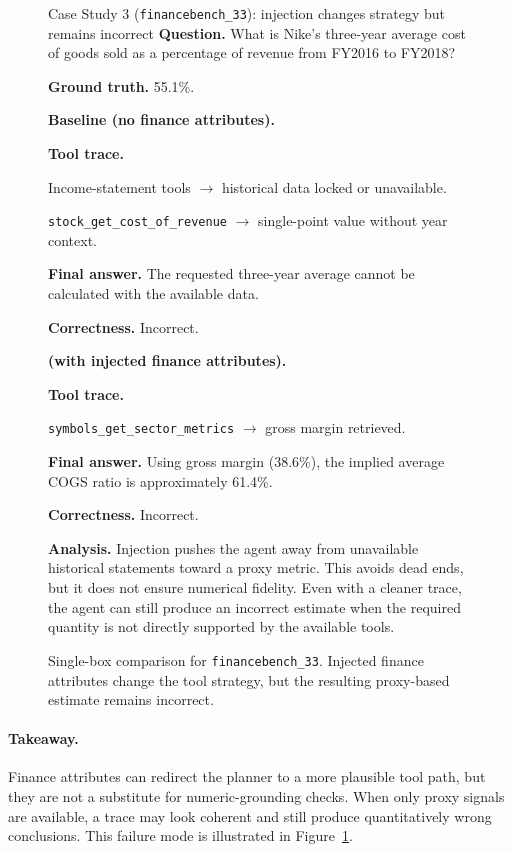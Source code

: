 \begin{figure}[!t]
\begin{casecard}{Case Study 3 (\texttt{financebench\_33}): injection changes strategy but remains incorrect}
\textbf{Question.} What is Nike's three-year average cost of goods sold as a percentage of revenue from FY2016 to FY2018?\par
\smallskip
\textbf{Ground truth.} 55.1\%.\par
\medskip
\begin{minipage}[t]{0.49\textwidth}
  
\textbf{Baseline (no finance attributes).}\par
\textbf{Tool trace.}\par
Income-statement tools $\rightarrow$ historical data locked or unavailable.\par
\texttt{stock\_get\_cost\_of\_revenue} $\rightarrow$ single-point value without year context.\par
\textbf{Final answer.} The requested three-year average cannot be calculated with the available data.\par
\textbf{Correctness.} Incorrect.\par
\end{minipage}\hfill
\begin{minipage}[t]{0.49\textwidth}
\textbf{\methodname{} (with injected finance attributes).}\par
\textbf{Tool trace.}\par
\texttt{symbols\_get\_sector\_metrics} $\rightarrow$ gross margin retrieved.\par
\textbf{Final answer.} Using gross margin (38.6\%), the implied average COGS ratio is approximately 61.4\%.\par
\textbf{Correctness.} Incorrect.\par
\end{minipage}
\medskip

\textbf{Analysis.} Injection pushes the agent away from unavailable historical statements toward a proxy metric. This avoids dead ends, but it does not ensure numerical fidelity. Even with a cleaner trace, the agent can still produce an incorrect estimate when the required quantity is not directly supported by the available tools.\par
\end{casecard}
\caption{Single-box comparison for \texttt{financebench\_33}. Injected finance attributes change the tool strategy, but the resulting proxy-based estimate remains incorrect.}
\label{fig:case_study_financebench_cogs}
\end{figure}



\paragraph{Takeaway.}
Finance attributes can redirect the planner to a more plausible tool path, but they are not a substitute
for numeric-grounding checks. When only proxy signals are available, a trace may look coherent and still
produce quantitatively wrong conclusions.
This failure mode is illustrated in Figure~\ref{fig:case_study_financebench_cogs}.
